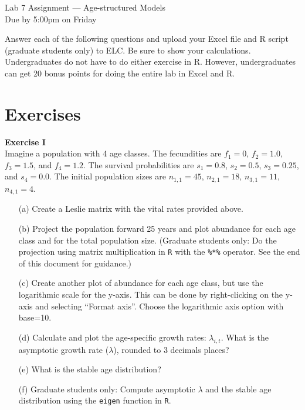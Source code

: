 \documentclass[12pt]{article}\usepackage[]{graphicx}\usepackage[]{xcolor}
\begin{document}
{
  \Large
  \centering
  Lab 7 Assignment --- Age-structured Models \\
  Due by 5:00pm on Friday \par
}

\vspace{12pt}

Answer each of the following questions and upload your Excel file and
R script (graduate students only) to ELC. Be sure to show your
calculations. Undergraduates do not have to do either exercise in
R. However, undergraduates can get 20 bonus points for doing the
entire lab in Excel and R. \\  

\section*{Exercises}


{\bf Exercise I \\}
Imagine a population with 4 age classes. The fecundities are $f_1=0$,
$f_2=1.0$, $f_3=1.5$, and $f_4=1.2$. The survival probabilities are
$s_1=0.8$, $s_2=0.5$, $s_3=0.25$, and $s_4=0.0$. The initial
population sizes are $n_{1,1}=45$, $n_{2,1}=18$, $n_{3,1}=11$, $n_{4,1}=4$.
\begin{itemize}
  \item[(a)] Create a Leslie matrix with the vital rates provided above.
  \item[(b)] Project the population forward 25 years and plot abundance for
    each age class and for the total population size. (Graduate students
    only: Do the projection using matrix multiplication in {\tt R} with
    the \texttt{\%*\%} operator. See the end of this document for
    guidance.)
  \item[(c)] Create another plot of abundance for each age class, but use the
    logarithmic scale for the y-axis. This can be done by right-clicking
    on the y-axis and selecting ``Format axis''. Choose the logarithmic
    axis option with base=10.
  \item[(d)] Calculate and plot the age-specific
    growth rates: $\lambda_{i,t}$. What is the asymptotic growth rate
    ($\lambda$), rounded to 3 decimals places?
  \item[(e)] What is the stable age distribution?
  \item[(f)] Graduate students only: Compute asymptotic $\lambda$ and
    the stable age distribution using the \texttt{eigen} function in {\tt R}.
\end{itemize}
\end{document}
